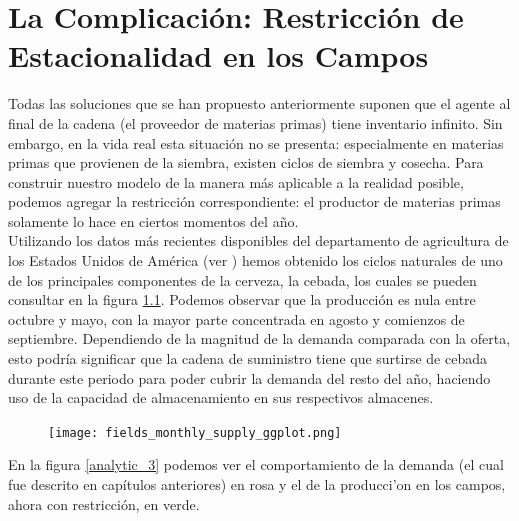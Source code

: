 \chapter{La Complicaci\'on: Restricci\'on de Estacionalidad en los Campos}

Todas las soluciones que se han propuesto anteriormente suponen que el agente al final de la cadena (el proveedor de materias primas) tiene inventario infinito. Sin embargo, en la vida real esta situaci\'on no se presenta: especialmente en materias primas que provienen de la siembra, existen ciclos de siembra y cosecha. Para construir nuestro modelo de la manera m\'as aplicable a la realidad posible, podemos agregar la restricci\'on correspondiente: el productor de materias primas solamente lo hace en ciertos momentos del a\~no.\\

Utilizando los datos m\'as recientes disponibles del departamento de agricultura de los Estados Unidos de Am\'erica (ver \citet{USDA}) hemos obtenido los ciclos naturales de uno de los principales componentes de la cerveza, la cebada, los cuales se pueden consultar en la figura \ref{fields}. Podemos observar que la producci\'on es nula entre octubre y mayo, con la mayor parte concentrada en agosto y comienzos de septiembre. Dependiendo de la magnitud de la demanda comparada con la oferta, esto podr\'ia significar que la cadena de suministro tiene que surtirse de cebada durante este periodo para poder cubrir la demanda del resto del a\~no, haciendo uso de la capacidad de almacenamiento en sus respectivos almacenes.\\

\begin{figure}[ht!]
\caption{ }
\label{fields}
\texttt{[image: fields\_monthly\_supply\_ggplot.png]}
\centering
\end{figure}

En la figura \ref{analytic_3} podemos ver el comportamiento de la demanda (el cual fue descrito en cap\'itulos anteriores) en rosa y el de la producci'on en los campos, ahora con restricci\'on, en verde. \\

